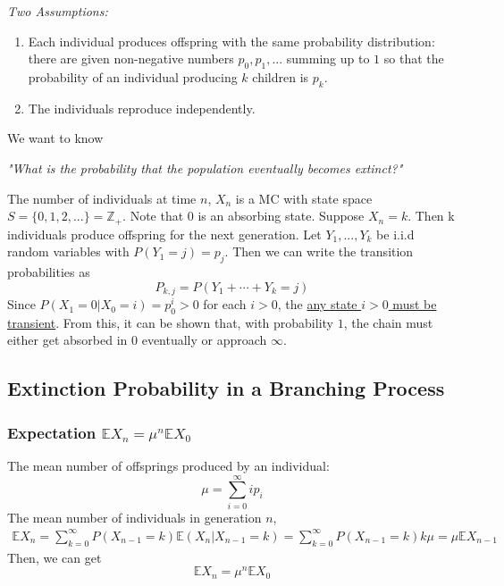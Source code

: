 \documentclass[11pt,a4paper]{article}
\begin{document}
\textit{Two Assumptions:}
\begin{enumerate}[(1)]
    \item Each individual produces offspring with the same probability distribution: there are given non-negative numbers $p_0, p_1, ...$ summing up to $1$ so that the probability of an individual producing $k$ children is $p_k$.
    \item The individuals reproduce independently.
\end{enumerate}

We want to know
\begin{center}
    \textit{"What is the probability that the population eventually becomes extinct?"}
\end{center}

The number of individuals at time $n$, $X_n$ is a MC with state space $S = \{0,1,2,...\} = \mathbb{Z}_+$. Note that $0$ is an absorbing state. Suppose $X_n = k$. Then k individuals produce offspring for the next generation. Let $Y_1,...,Y_k$ be i.i.d random variables with $P(Y_1 = j) = p_j$. Then we can write the transition probabilities as $$P_{k,j}=P(Y_1+\cdots+Y_k=j)$$
Since $P(X_1=0|X_0=i)=p_0^i>0$ for each $i>0$, the \underline{any state $i>0$ must be transient}. From this, it can be shown that, with probability $1$, the chain must either get absorbed in $0$ eventually or approach $\infty$.

\subsection{Extinction Probability in a Branching Process}
\subsubsection{Expectation $\mathbb{E}X_n=\mu^n \mathbb{E}X_0$}
The mean number of offsprings produced by an individual: $$\mu=\sum_{i=0}^\infty i p_i$$
The mean number of individuals in generation $n$,
\begin{equation}
    \begin{aligned}
        \mathbb{E}X_n=\sum_{k=0}^\infty P(X_{n-1}=k)\mathbb{E}(X_n|X_{n-1}=k)=\sum_{k=0}^\infty P(X_{n-1}=k)k\mu=\mu \mathbb{E}X_{n-1}
    \end{aligned}
    \nonumber
\end{equation}
Then, we can get $$\mathbb{E}X_n=\mu^n \mathbb{E}X_0$$
\end{document}
